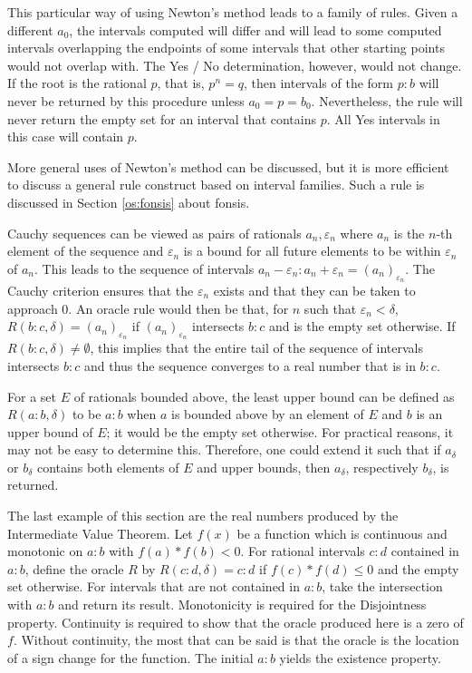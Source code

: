 \documentclass[12pt]{article}
\begin{document}
This particular way of using Newton's method leads to a family of rules. Given a different $a_0$, the intervals computed will differ and will lead to some computed intervals overlapping the endpoints of some intervals that other starting points would not overlap with. The Yes / No determination, however, would not  change. If the root is the rational $p$, that is, $p^n = q$,  then intervals of the form $p:b$ will never be returned by this procedure unless $a_0 = p = b_0$. Nevertheless, the rule will never return the empty set for an interval that contains $p$. All Yes intervals in this case will contain $p$. 

More general uses of Newton's method can be discussed, but it is more efficient to discuss a general rule construct based on interval families. Such a rule is discussed in Section \ref{os:fonsis} about fonsis. 

Cauchy sequences can be viewed as pairs of rationals $a_n, \varepsilon_n$ where $a_n$ is the $n$-th element of the sequence and $\varepsilon_n$ is a bound for all future elements to be within $\varepsilon_n$ of $a_n$. This leads to the sequence of intervals $a_n-\varepsilon_n:a_n+\varepsilon_n = (a_n)_{\varepsilon_n}$. The Cauchy criterion ensures that the $\varepsilon_n$ exists and that they can be taken to approach 0. An oracle rule would then be that, for $n$ such that $\varepsilon_n < \delta$,  $R(b:c, \delta) = (a_n)_{\varepsilon_n}$ if $(a_n)_{\varepsilon_n}$ intersects $b:c$ and is the empty set otherwise. If $R(b:c, \delta) \neq \emptyset$, this implies that the entire tail of the sequence of intervals intersects $b:c$ and thus the sequence converges to a real number that is in $b:c$.  

For a set $E$ of rationals bounded above, the least upper bound can be defined as $R(a:b, \delta)$ to be $a:b$ when $a$ is bounded above by an element of $E$ and $b$ is an upper bound of $E$; it would be the empty set otherwise. For practical reasons, it may not be easy to determine this. Therefore, one could extend it such that if $a_\delta$ or $b_\delta$ contains both elements of $E$ and upper bounds, then $a_\delta$, respectively $b_\delta$, is returned. 

The last example of this section are the real numbers produced by the Intermediate Value Theorem. Let $f(x)$ be a function which is continuous and monotonic on $a:b$ with $f(a)*f(b) < 0$. For rational intervals $c:d$ contained in $a:b$, define the oracle $R$ by $R(c:d, \delta) = c:d$ if $f(c)*f(d) \leq 0$ and the empty set otherwise. For intervals that are not contained in $a:b$, take the intersection with $a:b$ and return its result. Monotonicity is required for the Disjointness property. Continuity is required to show that the oracle produced here is a zero of $f$. Without continuity, the most that can be said is that the oracle is the location of a sign change for the function. The initial $a:b$ yields the existence property. 
\end{document}
